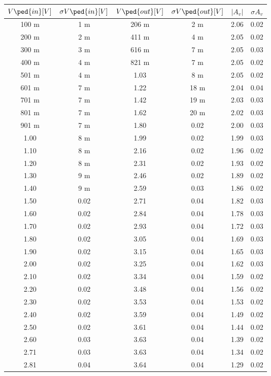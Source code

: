 \documentclass[10pt, a4paper, italian]{article}
\begin{document}
\begin{table}[htbp]
\centering
\begin{tabular}{cccccc}
\toprule
$V\ped{in} [V]$ & $\sigma V\ped{in}[V]$ & $V\ped{out} [V]$ & $\sigma V\ped{out} [V]$ & $|A_v|$ & $\sigma A_v$ \\
\midrule
\midrule
100 m & 1 m  & 206 m & 2 m   & 2.06 & 0.02 \\
200 m & 2 m  & 411 m & 4 m   & 2.05 & 0.02 \\
300 m & 3 m  & 616 m & 7 m  & 2.05 & 0.03 \\
400 m & 4 m  & 821 m & 7 m  & 2.05 & 0.02 \\
501 m & 4 m  & 1.03  & 8 m  & 2.05 & 0.02 \\
601 m & 7 m  & 1.22  & 18 m & 2.04 & 0.04 \\
701 m & 7 m  & 1.42  & 19 m & 2.03 & 0.03 \\
801 m & 7 m  & 1.62  & 20 m & 2.02 & 0.03 \\
901 m & 7 m  & 1.80  & 0.02 & 2.00 & 0.03 \\
1.00  & 8 m  & 1.99  & 0.02 & 1.99 & 0.03 \\
1.10  & 8 m  & 2.16  & 0.02 & 1.96 & 0.02 \\
1.20  & 8 m  & 2.31  & 0.02 & 1.93 & 0.02 \\
1.30  & 9 m  & 2.46  & 0.02 & 1.89 & 0.02 \\
1.40  & 9 m  & 2.59  & 0.03 & 1.86 & 0.02 \\
1.50  & 0.02 & 2.71  & 0.04 & 1.82 & 0.03 \\
1.60  & 0.02 & 2.84  & 0.04 & 1.78 & 0.03 \\
1.70  & 0.02 & 2.93  & 0.04 & 1.72 & 0.03 \\
1.80  & 0.02 & 3.05  & 0.04 & 1.69 & 0.03 \\
1.90  & 0.02 & 3.15  & 0.04 & 1.65 & 0.03 \\
2.00  & 0.02 & 3.25  & 0.04 & 1.62 & 0.03 \\
2.10  & 0.02 & 3.34  & 0.04 & 1.59 & 0.02 \\
2.20  & 0.02 & 3.48  & 0.04 & 1.56 & 0.02 \\
2.30  & 0.02 & 3.53  & 0.04 & 1.53 & 0.02 \\
2.40  & 0.02 & 3.59  & 0.04 & 1.49 & 0.02 \\
2.50  & 0.02 & 3.61  & 0.04 & 1.44 & 0.02 \\
2.60  & 0.03 & 3.63  & 0.04 & 1.39 & 0.02 \\
2.71  & 0.03 & 3.63  & 0.04 & 1.34 & 0.02 \\
2.81  & 0.04 & 3.64  & 0.04 & 1.29 & 0.02 \\
\bottomrule
\end{tabular}
\end{table}
\end{document}
